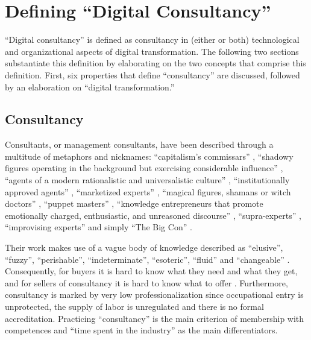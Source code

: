 \documentclass[12pt]{article}
\begin{document}
\hypertarget{defining-digital-consultancy}{%
\section{Defining ``Digital
Consultancy''}\label{defining-digital-consultancy}}

``Digital consultancy'' is defined as consultancy in (either or both)
technological and organizational aspects of digital transformation. The
following two sections substantiate this definition by elaborating on
the two concepts that comprise this definition. First, six properties
that define ``consultancy'' are discussed, followed by an elaboration on
``digital transformation.''

\hypertarget{consultancy}{%
\subsection{Consultancy}\label{consultancy}}

Consultants, or management consultants, have been described through a
multitude of metaphors and nicknames: ``capitalism's commissars''
\citep[ 93]{thrift2005}, ``shadowy figures operating in the background
but exercising considerable influence'' \citep[ 31]{kipping2012},
``agents of a modern rationalistic and universalistic culture'' \citep[
190]{kipping2012}, ``institutionally approved agents'' \citep[
193]{kipping2012}, ``marketized experts'' \citep[ 265]{furusten2012},
``magical figures, shamans or witch doctors'' \citep[ 68]{fincham2002},
``puppet masters'' \citep[ 69]{fincham2002}, ``knowledge entrepreneurs
that promote emotionally charged, enthusiastic, and unreasoned
discourse'' \citep[ 37]{leicht2006}, ``supra-experts'' \citep[
94]{kieser2006}, ``improvising experts'' \citep[ 272]{furusten2009} and
simply ``The Big Con'' \citep{mazzucato2023}.

Their work makes use of a vague body of knowledge described as
``elusive'', ``fuzzy'', ``perishable'', ``indeterminate'', ``esoteric'',
``fluid'' and ``changeable'' \citep{muzio2011}. Consequently, for buyers
it is hard to know what they need and what they get, and for sellers of
consultancy it is hard to know what to offer \citep[ 266]{furusten2012}.
Furthermore, consultancy is marked by very low professionalization since
occupational entry is unprotected, the supply of labor is unregulated
and there is no formal accreditation. \citep[ 20]{fincham2006}
Practicing ``consultancy'' is the main criterion of membership with
competences and ``time spent in the industry'' as the main
differentiators.
\end{document}

